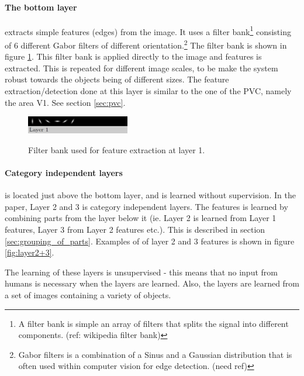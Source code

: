 \paragraph*{The bottom layer} extracts simple features (edges) from the image. It uses a filter bank\footnote{A filter bank is simple an array of filters that splits the signal into different components. (ref: wikipedia filter bank)}
 consisting of 6 different Gabor filters of different orientation.\footnote{Gabor filters is a combination of a Sinus and a Gaussian distribution that is often used within computer vision for edge detection. (need ref)} 
The filter bank is shown in figure \ref{fig:filterbank}. 
This filter bank is applied directly to the image and features is extracted. 
This is repeated for different image scales, to be make the system robust towards the objects being of different sizes. 
The feature extraction/detection done at this layer is similar to the one of the PVC, namely the area V1. See section \ref{sec:pvc}. 


\begin{figure}[h!] %
\centering
\includegraphics[width=0.4\textwidth]{graphics/layer1_features}
\label{fig:filterbank}
\caption{Filter bank used for feature extraction at layer 1.}
\end{figure}

\paragraph*{Category independent layers} is located just above the bottom layer, and is learned without supervision. In the paper, Layer 2 and 3 is category independent layers.  The features is learned by combining parts from the layer below it (ie. Layer 2 is learned from Layer 1 features, Layer 3 from Layer 2 features etc.). This is described in section \ref{sec:grouping_of_parts}. Examples of of layer 2 and 3 features is shown in figure \ref{fig:layer2+3}. 

The learning of these layers is unsupervised - this means that no input from humans is necessary when the layers are learned. Also, the layers are learned from a set of images containing a variety of objects. 


